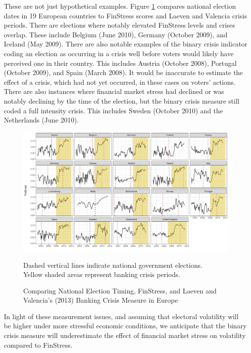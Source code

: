 \documentclass[]{article}
\begin{document}
These are not just hypothetical examples. Figure \ref{elect_crisis_compare} compares national election dates in 19 European countries to FinStress scores and Laeven and Valencia crisis periods. There are elections where notably elevated FinStress levels and \cite{laeven2013} crises overlap. These include Belgium (June 2010), Germany (October 2009), and Iceland (May 2009). There are also notable examples of the binary crisis indicator coding an election as occurring in a crisis well before voters would likely have perceived one in their country. This includes Austria (October 2008), Portugal (October 2009), and Spain (March 2008). It would be inaccurate to estimate the effect of a crisis, which had not yet occurred, in these cases on voters' actions. There are also instances where financial market stress had declined or was notably declining by the time of the election, but the binary crisis measure still coded a full intensity crisis. This includes Sweden (October 2010) and the Netherlands (June 2010).

\begin{figure}
	\caption{Comparing National Election Timing, FinStress, and Laeven and Valencia's (2013) Banking Crisis Measure in Europe}
    \label{elect_crisis_compare}
    \begin{center}
		\includegraphics[scale=0.55]{figures/election_timing_crisis_comp.pdf}
	\end{center}
    {\scriptsize{Dashed vertical lines indicate national government elections.\\
    Yellow shaded areas represent \cite{laeven2013} banking crisis periods.
    }}
\end{figure}

In light of these measurement issues, and assuming that electoral volatility will be higher under more stressful economic conditions, we anticipate that the binary crisis measure will underestimate the effect of financial market stress on volatility compared to FinStress.
\end{document}
